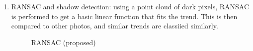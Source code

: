 \documentclass{article}
\begin{document}
\begin{enumerate}[1.]
\item RANSAC and shadow detection: using a point cloud of dark pixels, RANSAC is performed to get a basic linear function that fits the trend. This is then compared to other photos, and similar trends are classiied similarly.
\begin{figure}[H]
\centering
\setlength\fboxsep{2pt}
\setlength\fboxrule{0pt}
\caption{
RANSAC (proposed)
}
\end{figure}

\end{enumerate}
\end{document}
